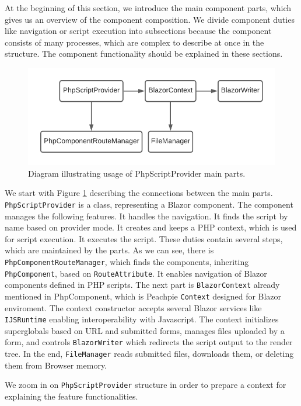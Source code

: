 At the beginning of this section, we introduce the main component parts, which gives us an overview of the component composition.
We divide component duties like navigation or script execution into subsections because the component consists of many processes, which are complex to describe at once in the structure.
The component functionality should be explained in these sections.
\par
\begin{figure}[b]\centering
\includegraphics[scale=0.8]{./img/PhpScriptProvider}
\caption{Diagram illustrating usage of PhpScriptProvider main parts.}
\label{img18:provider}
\end{figure}
\par
We start with Figure \ref{img18:provider} describing the connections between the main parts.
\texttt{PhpScriptProvider} is a class, representing a Blazor component.
The component manages the following features.
It handles the navigation.
It finds the script by name based on provider mode.
It creates and keeps a PHP context, which is used for script execution.
It executes the script.
These duties contain several steps, which are maintained by the parts.
As we can see, there is \texttt{PhpComponentRouteManager}, which finds the components, inheriting \texttt{PhpComponent}, based on \texttt{RouteAttribute}.
It enables navigation of Blazor components defined in PHP scripts.
The next part is \texttt{BlazorContext} already mentioned in PhpComponent, which is Peachpie \texttt{Context} designed for Blazor enviroment.
The context constructor accepts several Blazor services like \texttt{IJSRuntime} enabling interoperability with Javascript.
The context initializes superglobals based on URL and submitted forms, manages files uploaded by a form, and controls  \texttt{BlazorWriter} which redirects the script output to the render tree.
In the end, \texttt{FileManager} reads submitted files, downloads them, or deleting them from Browser memory.
\par
We zoom in on \texttt{PhpScriptProvider} structure in order to prepare a context for explaining the feature functionalities.
